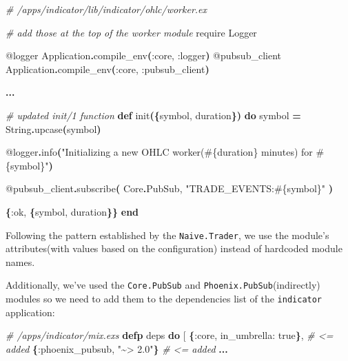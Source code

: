 \documentclass[
  oneside]{book}
\newenvironment{Shaded}{\begin{snugshade}}{\end{snugshade}}
\newcommand{\CommentTok}[1]{\textcolor[rgb]{0.56,0.35,0.01}{\textit{#1}}}
\newcommand{\ConstantTok}[1]{\textcolor[rgb]{0.56,0.35,0.01}{#1}}
\newcommand{\FunctionTok}[1]{\textcolor[rgb]{0.13,0.29,0.53}{\textbf{#1}}}
\newcommand{\ImportTok}[1]{#1}
\newcommand{\KeywordTok}[1]{\textcolor[rgb]{0.13,0.29,0.53}{\textbf{#1}}}
\newcommand{\NormalTok}[1]{#1}
\newcommand{\OperatorTok}[1]{\textcolor[rgb]{0.81,0.36,0.00}{\textbf{#1}}}
\newcommand{\OtherTok}[1]{\textcolor[rgb]{0.56,0.35,0.01}{#1}}
\newcommand{\StringTok}[1]{\textcolor[rgb]{0.31,0.60,0.02}{#1}}
\newcommand{\VariableTok}[1]{\textcolor[rgb]{0.00,0.00,0.00}{#1}}
\begin{document}
\begin{Shaded}
\begin{Highlighting}[]
\CommentTok{\# /apps/indicator/lib/indicator/ohlc/worker.ex}

  \CommentTok{\# add those at the top of the worker module}
  \ImportTok{require} \ConstantTok{Logger}

  \OtherTok{@logger} \ConstantTok{Application}\OperatorTok{.}\NormalTok{compile\_env}\FunctionTok{(}\VariableTok{:core}\NormalTok{, }\VariableTok{:logger}\FunctionTok{)}
  \OtherTok{@pubsub\_client} \ConstantTok{Application}\OperatorTok{.}\NormalTok{compile\_env}\FunctionTok{(}\VariableTok{:core}\NormalTok{, }\VariableTok{:pubsub\_client}\FunctionTok{)}

  \OperatorTok{...}

  \CommentTok{\# updated \textasciigrave{}init/1\textasciigrave{} function}
  \KeywordTok{def}\NormalTok{ init}\FunctionTok{(\{}\NormalTok{symbol, duration}\FunctionTok{\})} \KeywordTok{do}
\NormalTok{    symbol }\OperatorTok{=} \ConstantTok{String}\OperatorTok{.}\NormalTok{upcase}\FunctionTok{(}\NormalTok{symbol}\FunctionTok{)}

    \OtherTok{@logger}\OperatorTok{.}\NormalTok{info}\FunctionTok{(}\StringTok{"Initializing a new OHLC worker(}\OtherTok{\#\{}\NormalTok{duration}\OtherTok{\}}\StringTok{ minutes) for }\OtherTok{\#\{}\NormalTok{symbol}\OtherTok{\}}\StringTok{"}\FunctionTok{)}

    \OtherTok{@pubsub\_client}\OperatorTok{.}\NormalTok{subscribe}\FunctionTok{(}
      \ConstantTok{Core}\OperatorTok{.}\ConstantTok{PubSub}\NormalTok{,}
      \StringTok{"TRADE\_EVENTS:}\OtherTok{\#\{}\NormalTok{symbol}\OtherTok{\}}\StringTok{"}
    \FunctionTok{)}

    \FunctionTok{\{}\VariableTok{:ok}\NormalTok{, }\FunctionTok{\{}\NormalTok{symbol, duration}\FunctionTok{\}\}}
  \KeywordTok{end}
\end{Highlighting}
\end{Shaded}

Following the pattern established by the \texttt{Naive.Trader}, we use the module's attributes(with values based on the configuration) instead of hardcoded module names.

Additionally, we've used the \texttt{Core.PubSub} and \texttt{Phoenix.PubSub}(indirectly) modules so we need to add them to the dependencies list of the \texttt{indicator} application:

\begin{Shaded}
\begin{Highlighting}[]
\CommentTok{\# /apps/indicator/mix.exs}
  \KeywordTok{defp}\NormalTok{ deps }\KeywordTok{do}
    \OtherTok{[}
      \FunctionTok{\{}\VariableTok{:core}\NormalTok{, }\VariableTok{in\_umbrella:} \ConstantTok{true}\FunctionTok{\}}\NormalTok{, }\CommentTok{\# \textless{}= added}
      \FunctionTok{\{}\VariableTok{:phoenix\_pubsub}\NormalTok{, }\StringTok{"\textasciitilde{}\textgreater{} 2.0"}\FunctionTok{\}} \CommentTok{\# \textless{}= added}
      \OperatorTok{...}
\end{Highlighting}
\end{Shaded}
\end{document}

